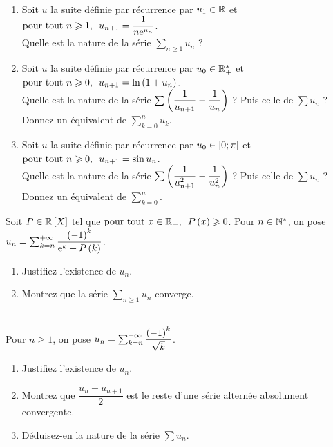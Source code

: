 \begin{exoss}~\\
\begin{enumerate}
    \item Soit \(u\) la suite définie par récurrence par \(u_1\in\mathbb{R}\) et \(\quantifs{\tpt n\geq1}u_{n+1}=\dfrac{1}{n\e{u_n}}\). \\ Quelle est la nature de la série \(\sum_{n\geq1}u_n\) ? \\
    \item Soit \(u\) la suite définie par récurrence par \(u_0\in\mathbb{R}_+^*\) et \(\quantifs{\tpt n\geq0}u_{n+1}=\ln\paren{1+u_n}\). \\ Quelle est la nature de la série \(\sum\left(\dfrac{1}{u_{n+1}}-\dfrac{1}{u_n}\right)\) ? Puis celle de \(\sum u_n\) ? Donnez un équivalent de \(\sum_{k=0}^nu_k\). \\
    \item Soit \(u\) la suite définie par récurrence par \(u_0\in\left]0;\pi\right[\) et \(\quantifs{\tpt n\geq0}u_{n+1}=\sin u_n\). \\ Quelle est la nature de la série \(\sum\left(\dfrac{1}{u_{n+1}^2}-\dfrac{1}{u_n^2}\right)\) ? Puis celle de \(\sum u_n\) ? Donnez un équivalent de \(\sum_{k=0}^n\).
\end{enumerate}
\end{exoss}

\begin{corr}
\end{corr}

\begin{exoss}[Exercice 8]
Soit \(P\in\poly[\R]\) tel que \(\quantifs{\tpt x\in\Rp}P\paren{x}\geq0\). Pour \(n\in\mathbb{N}^*\), on pose \(u_n=\sum_{k=n}^{+\infty}\dfrac{\left(-1\right)^k}{\mathrm{e}^{k}+P\left(k\right)}\).

\begin{enumerate}
    \item Justifiez l'existence de \(u_n\). \\
    \item Montrez que la série \(\sum_{n\geq1}u_n\) converge.
\end{enumerate}
\end{exoss}

\begin{corr}
\end{corr}

\begin{exoss}[Exercice 9]~\\
Pour \(n\geq1\), on pose \(u_n=\sum_{k=n}^{+\infty}\dfrac{\left(-1\right)^k}{\sqrt{k}}\).

\begin{enumerate}
    \item Justifiez l'existence de \(u_n\). \\
    \item Montrez que \(\dfrac{u_n+u_{n+1}}{2}\) est le reste d'une série alternée absolument convergente. \\
    \item Déduisez-en la nature de la série \(\sum u_n\).
\end{enumerate}
\end{exoss}

